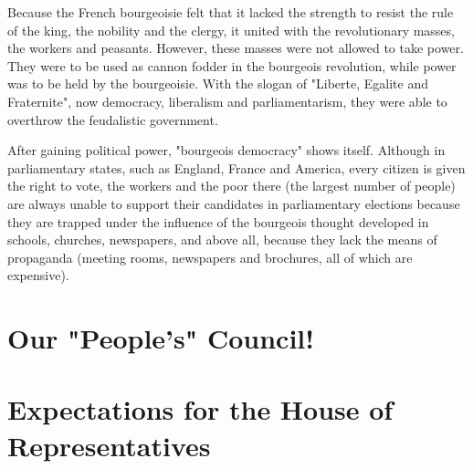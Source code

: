 Because the French bourgeoisie felt that it lacked the strength to resist the rule of the king, the nobility and the 
clergy, it united with the revolutionary masses, the workers and peasants. However, these masses were not allowed to 
take power. They were to be used as cannon fodder in the bourgeois revolution, while power was to be held by the 
bourgeoisie. With the slogan of "Liberte, Egalite and Fraternite", now democracy, liberalism and parliamentarism, 
they were able to overthrow the feudalistic government.\nline

After gaining political power, "bourgeois democracy" shows itself. Although in parliamentary states, 
such as England, France and America, every citizen is given the right to vote, the workers and the poor 
there (the largest number of people) are always unable to support their candidates in parliamentary 
elections because they are trapped under the influence of the bourgeois thought developed in schools, 
churches, newspapers, and above all, because they lack the means of propaganda (meeting rooms, newspapers and brochures, 
all of which are expensive).\nline



\section{Our "People's" Council!}

\section{Expectations for the House of Representatives}